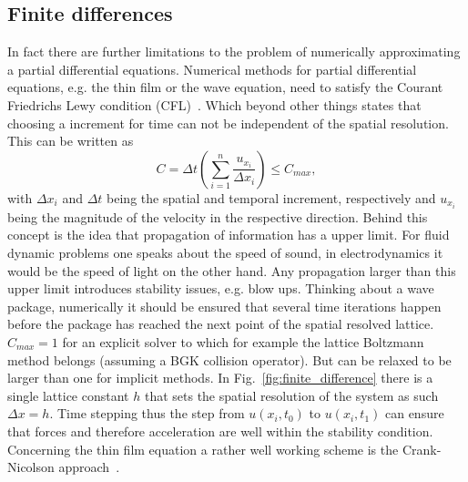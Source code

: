 \subsection{Finite differences}
In fact there are further limitations to the problem of numerically approximating a partial differential equations.
Numerical methods for partial differential equations, e.g. the thin film or the wave equation, need to satisfy the Courant Friedrichs Lewy condition (CFL)~\cite{courant1928partiellen}.  
Which beyond other things states that choosing a increment for time can not be independent of the spatial resolution.
This can be written as
\begin{equation}\label{eq:CFL}
    C = \Delta t \left(\sum_{i=1}^n \frac{u_{x_i}}{\Delta x_i}\right) \leq C_{max},
\end{equation}
with $\Delta x_i$ and $\Delta t$ being the spatial and temporal increment, respectively and $u_{x_i}$ being the magnitude of the velocity in the respective direction.
Behind this concept is the idea that propagation of information has a upper limit.
For fluid dynamic problems one speaks about the speed of sound, in electrodynamics it would be the speed of light on the other hand.
Any propagation larger than this upper limit introduces stability issues, e.g. blow ups.
Thinking about a wave package, numerically it should be ensured that several time iterations happen before the package has reached the next point of the spatial resolved lattice.
$C_{max} = 1$ for an explicit solver to which for example the lattice Boltzmann method belongs (assuming a BGK collision operator).
But can be relaxed to be larger than one for implicit methods.
In Fig.~\ref{fig:finite_difference} there is a single lattice constant $h$ that sets the spatial resolution of the system as such $\Delta x = h$.
Time stepping thus the step from $u(x_i,t_0)$ to $u(x_i,t_1)$ can ensure that forces and therefore acceleration are well within the stability condition.
Concerning the thin film equation a rather well working scheme is the Crank-Nicolson approach~\cite{crank_nicolson_1947, diezGlobalModelsMoving2000, 10.5555/1403886}.

